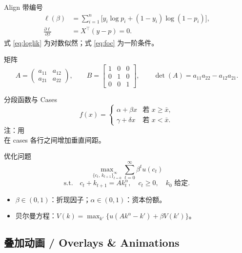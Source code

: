 \begin{frame}{Align 带编号}
  \begin{align}
    \ell(\beta) &= \sum_{i=1}^{n}
      \bigl[y_i \log p_i + (1-y_i)\log(1-p_i)\bigr], \label{eq:loglik} \\
    \frac{\partial \ell}{\partial \beta} &= X^\top(y - p) = 0. \label{eq:foc}
  \end{align}
  式 \eqref{eq:loglik} 为对数似然；式 \eqref{eq:foc} 为一阶条件。
\end{frame}

\begin{frame}{矩阵}
  \[
    A = \begin{pmatrix} a_{11} & a_{12} \\ a_{21} & a_{22} \end{pmatrix}, \qquad
    B = \begin{bmatrix} 1 & 0 & 0 \\ 0 & 1 & 0 \\ 0 & 0 & 1 \end{bmatrix}, \qquad
    \det(A) = a_{11}a_{22} - a_{12}a_{21}.
  \]
\end{frame}

\begin{frame}{分段函数与 Cases}
  \[
    f(x) = \begin{cases}
      \alpha + \beta x   & \text{若 } x \geq \bar{x}, \\[4pt]
      \gamma + \delta x  & \text{若 } x < \bar{x}.
    \end{cases}
  \]
  \medskip
  注：用 \texttt{\\[4pt]} 在 cases 各行之间增加垂直间距。
\end{frame}

\begin{frame}{优化问题}
  \[
    \max_{\{c_t,\,k_{t+1}\}_{t=0}^{\infty}}
    \sum_{t=0}^{\infty} \beta^t u(c_t)
  \]
  \[
    \text{s.t.} \quad c_t + k_{t+1} = A k_t^\alpha, \quad
    c_t \geq 0, \quad k_0 \text{ 给定}.
  \]
  \begin{itemize}
    \item $\beta \in (0,1)$：折现因子；\quad $\alpha \in (0,1)$：资本份额。
    \item 贝尔曼方程：$V(k) = \max_{k'} \bigl\{u(Ak^\alpha - k') + \beta V(k')\bigr\}$。
  \end{itemize}
\end{frame}

\subsection{叠加动画 / Overlays \& Animations}

